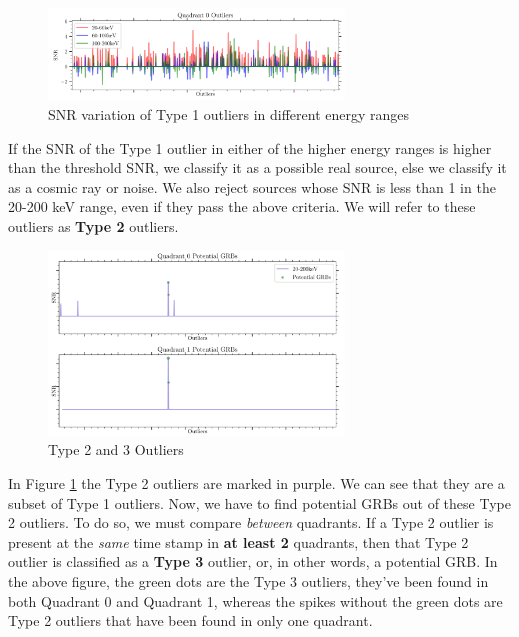 \documentclass[11pt]{book} %
\begin{document}
\begin{figure}[H]
    \centering
    \includegraphics[width=0.7\textwidth]{Pictures/type2.png}
    \caption{SNR variation of Type 1 outliers in different energy ranges}
\end{figure}

If the SNR of the Type 1 outlier in either of the higher energy ranges is higher than the threshold SNR, we classify it as a possible real source, else we classify it as a cosmic ray or noise. We also reject sources whose SNR is less than 1 in the 20-200 keV range, even if they pass the above criteria. We will refer to these outliers as \textbf{Type 2} outliers.

\begin{figure}[H]
    \centering
    \includegraphics[width=0.7\textwidth]{Pictures/type2_2.png}
    \caption{Type 2 and 3 Outliers}
    \label{fig:type2}
\end{figure}

In Figure \ref{fig:type2} the Type 2 outliers are marked in purple. We can see that they are a subset of Type 1 outliers. Now, we have to find potential GRBs out of these Type 2 outliers. To do so, we must compare \textsl{between} quadrants. If a Type 2 outlier is present at the \textsl{same} time stamp in \textbf{at least 2} quadrants, then that Type 2 outlier is classified as a \textbf{Type 3} outlier, or, in other words, a potential GRB. In the above figure, the green dots are the Type 3 outliers, they've been found in both Quadrant 0 and Quadrant 1, whereas the spikes without the green dots are Type 2 outliers that have been found in only one quadrant.
\end{document}
